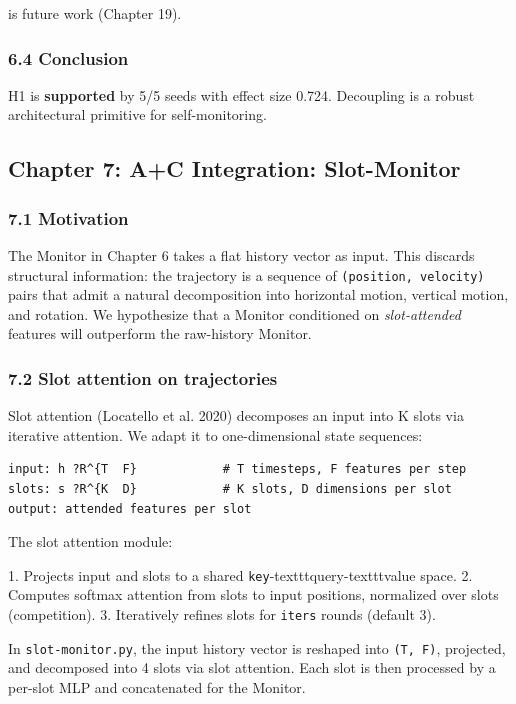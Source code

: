 \documentclass[11pt]{article}
\begin{document}
  is future work (Chapter 19).

\subsubsection{6.4 Conclusion}

H1 is \textbf{supported} by 5/5 seeds with effect size 0.724. Decoupling is a robust
architectural primitive for self-monitoring.

\hrulefill

\subsection{Chapter 7: A+C Integration: Slot-Monitor}

\subsubsection{7.1 Motivation}

The Monitor in Chapter 6 takes a flat history vector as input. This discards
structural information: the trajectory is a sequence of \texttt{(position, velocity)}
pairs that admit a natural decomposition into horizontal motion, vertical
motion, and rotation. We hypothesize that a Monitor conditioned on \textit{slot-attended}
features will outperform the raw-history Monitor.

\subsubsection{7.2 Slot attention on trajectories}

Slot attention (Locatello et al. 2020) decomposes an input into K slots via
iterative attention. We adapt it to one-dimensional state sequences:

\begin{verbatim}
input: h ?R^{T  F}            # T timesteps, F features per step
slots: s ?R^{K  D}            # K slots, D dimensions per slot
output: attended features per slot
\end{verbatim}

The slot attention module:

1. Projects input and slots to a shared \texttt{key}-texttt{query}-texttt{value} space.
2. Computes softmax attention from slots to input positions, normalized over
   slots (competition).
3. Iteratively refines slots for \texttt{iters} rounds (default 3).

In \texttt{slot-monitor.py}, the input history vector is reshaped into \texttt{(T, F)},
projected, and decomposed into 4 slots via slot attention. Each slot is then
processed by a per-slot MLP and concatenated for the Monitor.
\end{document}

